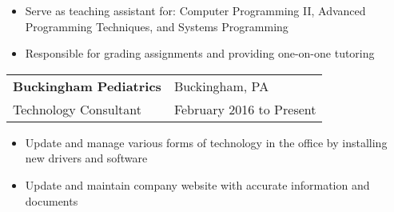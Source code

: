\documentclass[10pt,]{article}
\let\oldparagraph\paragraph
\renewcommand{\paragraph}[1]{\oldparagraph{#1}\mbox{}}
\begin{document}
\begin{itemize}
	\setlength\itemsep{-1.75em}
	\item Serve as teaching assistant for: Computer Programming II, Advanced Programming Techniques, and Systems Programming\\
	\item Responsible for grading assignments and providing one-on-one tutoring\\
\end{itemize}
\vspace{-2mm}

\begin{tabularx}{\textwidth}{l X}
    \textbf{Buckingham Pediatrics} & \hfill Buckingham, PA\\
    Technology Consultant          & \hfill February 2016 to Present
\end{tabularx}

\begin{itemize}
	\setlength\itemsep{-0.75em}
    \item Update and manage various forms of technology in the office by installing new drivers and software
    \item Update and maintain company website with accurate information and documents
\end{itemize}

\vspace{-3mm}


\end{document}
